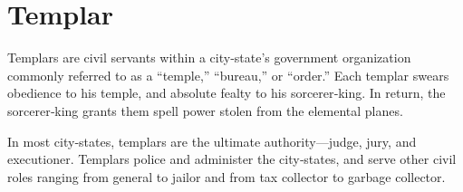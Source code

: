 \section{Templar}

Templars are civil servants within a city‐state's government organization commonly referred to as a “temple,” “bureau,” or “order.” Each templar swears obedience to his temple, and absolute fealty to his sorcerer‐king. In return, the sorcerer‐king grants them spell power stolen from the elemental planes.

In most city‐states, templars are the ultimate authority—judge, jury, and executioner. Templars police and administer the city‐states, and serve other civil roles ranging from general to jailor and from tax collector to garbage collector.

